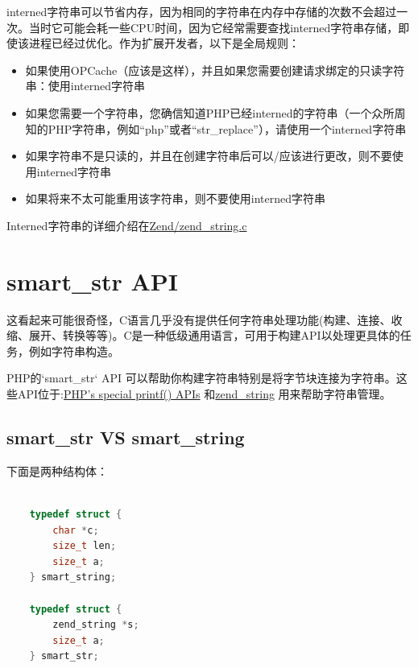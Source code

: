 interned字符串可以节省内存，因为相同的字符串在内存中存储的次数不会超过一次。当时它可能会耗一些CPU时间，因为它经常需要查找interned字符串存储，即使该进程已经过优化。作为扩展开发者，以下是全局规则：

\begin{itemize}
        \item 如果使用OPCache（应该是这样），并且如果您需要创建请求绑定的只读字符串：使用interned字符串
        \item 如果您需要一个字符串，您确信知道PHP已经interned的字符串（一个众所周知的PHP字符串，例如“php”或者“str\_replace”），请使用一个interned字符串
        \item 如果字符串不是只读的，并且在创建字符串后可以/应该进行更改，则不要使用interned字符串
        \item 如果将来不太可能重用该字符串，则不要使用interned字符串
\end{itemize}

Interned字符串的详细介绍在\href{https://github.com/php/php-src/blob/PHP-7.0/Zend/zend_string.c}{Zend/zend\_string.c}


\section{smart\_str API}

这看起来可能很奇怪，C语言几乎没有提供任何字符串处理功能(构建、连接、收缩、展开、转换等等)。C是一种低级通用语言，可用于构建API以处理更具体的任务，例如字符串构造。


PHP的`smart\_str` API 可以帮助你构建字符串特别是将字节块连接为字符串。这些API位于:\href{http://www.phpinternalsbook.com/php7/internal_types/strings/printing_functions.html}{PHP’s special printf() APIs} 和\href{http://www.phpinternalsbook.com/php7/internal_types/strings/zend_strings.html}{zend\_string} 用来帮助字符串管理。

\subsection{smart\_str VS smart\_string}

下面是两种结构体：

\begin{lstlisting}[language=c]

    typedef struct {
        char *c;
        size_t len;
        size_t a;
    } smart_string;

    typedef struct {
        zend_string *s;
        size_t a;
    } smart_str;

\end{lstlisting}


